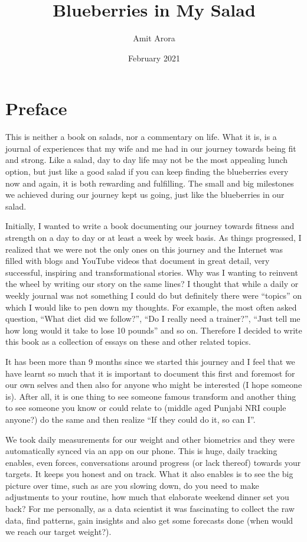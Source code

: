 \documentclass[
  oneside]{book}
\title{Blueberries in My Salad}
\author{Amit Arora}
\date{February 2021}
\begin{document}
\maketitle

{
\hypersetup{linkcolor=}
\setcounter{tocdepth}{1}
\tableofcontents
}
\hypertarget{preface}{%
\chapter{Preface}\label{preface}}

This is neither a book on salads, nor a commentary on life. What it is, is a journal of experiences that my wife and me had in our journey towards being fit and strong. Like a salad, day to day life may not be the most appealing lunch option, but just like a good salad if you can keep finding the blueberries every now and again, it is both rewarding and fulfilling. The small and big milestones we achieved during our journey kept us going, just like the blueberries in our salad.

Initially, I wanted to write a book documenting our journey towards fitness and strength on a day to day or at least a week by week basis. As things progressed, I realized that we were not the only ones on this journey and the Internet was filled with blogs and YouTube videos that document in great detail, very successful, inspiring and transformational stories. Why was I wanting to reinvent the wheel by writing our story on the same lines? I thought that while a daily or weekly journal was not something I could do but definitely there were ``topics'' on which I would like to pen down my thoughts. For example, the most often asked question, ``What diet did we follow?'', ``Do I really need a trainer?'', ``Just tell me how long would it take to lose 10 pounds'' and so on. Therefore I decided to write this book as a collection of essays on these and other related topics.

It has been more than 9 months since we started this journey and I feel that we have learnt so much that it is important to document this first and foremost for our own selves and then also for anyone who might be interested (I hope someone is). After all, it is one thing to see someone famous transform and another thing to see someone you know or could relate to (middle aged Punjabi NRI couple anyone?) do the same and then realize ``If they could do it, so can I''.

We took daily measurements for our weight and other biometrics and they were automatically synced via an app on our phone. This is huge, daily tracking enables, even forces, conversations around progress (or lack thereof) towards your targets. It keeps you honest and on track. What it also enables is to see the big picture over time, such as are you slowing down, do you need to make adjustments to your routine, how much that elaborate weekend dinner set you back? For me personally, as a data scientist it was fascinating to collect the raw data, find patterns, gain insights and also get some forecasts done (when would we reach our target weight?).
\end{document}
